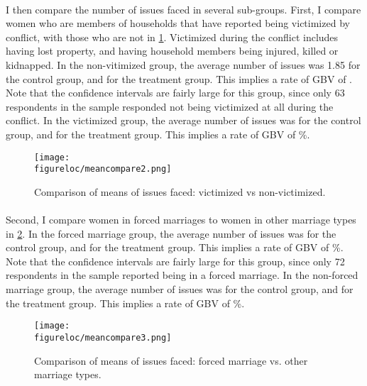 \documentclass[11pt,a4paper]{scrartcl} %
\newcommand{\figureloc}{C:/Users/Koen/Dropbox/PhD/Papers/CongoGBV/Figures}
\begin{document}
\paragraph{}
I then compare the number of issues faced in several sub-groups. First, I compare women who are members of households that have reported being victimized by conflict, with those who are not in \ref{fig:meancompare2}. Victimized during the conflict includes having lost property, and having household members being injured, killed or kidnapped. In the non-vitimized group, the average number of issues was  1.85 for the control group, and  for the treatment group. This implies a rate of GBV of . Note that the confidence intervals are fairly large for this group, since only 63 respondents in the sample responded not being victimized at all during the conflict. In the victimized group, the average number of issues was  for the control group, and  for the treatment group. This implies a rate of GBV of \%. 

\begin{figure}
  \texttt{[image: \\figureloc/meancompare2.png]}
  \caption{Comparison of means of issues faced: victimized vs non-victimized.}
  \label{fig:meancompare2}
\end{figure}

\paragraph{}
Second, I compare women in forced marriages to women in other marriage types in \ref{fig:meancompare3}. In the forced marriage group, the average number of issues was  for the control group, and  for the treatment group. This implies a rate of GBV of \%. Note that the confidence intervals are fairly large for this group, since only 72 respondents in the sample reported being in a forced marriage. In the non-forced marriage group, the average number of issues was  for the control group, and  for the treatment group. This implies a rate of GBV of \%. 

\begin{figure}
  \texttt{[image: \\figureloc/meancompare3.png]}
  \caption{Comparison of means of issues faced: forced marriage vs. other marriage types.}
  \label{fig:meancompare3}
\end{figure}
\end{document}
